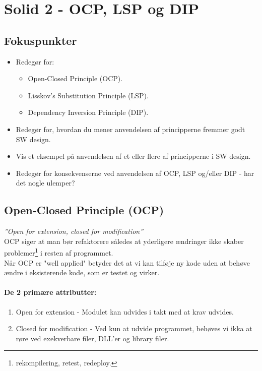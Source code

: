\section{Solid 2 - OCP, LSP og DIP}

\subsection{Fokuspunkter}

\begin{itemize}
	\item Redegør for:
	\begin{itemize}
		\item Open-Closed Principle (OCP).
		\item Lisskov's Substitution Principle (LSP).
		\item Dependency Inversion Principle (DIP).
	\end{itemize}
	\item Redegør for, hvordan du mener anvendelsen af principperne fremmer godt SW design.
	\item Vis et eksempel på anvendelsen af et eller flere af principperne i SW design.
	\item Redegør for konsekvenserne ved anvendelsen af OCP, LSP og/eller DIP - har det nogle ulemper?
\end{itemize}

\subsection{Open-Closed Principle (OCP)}\label{sec:ocp}
\textit{''Open for extension, closed for modification''}\\

OCP siger at man bør refaktorere således at yderligere ændringer ikke skaber problemer\footnote{rekompilering, retest, redeploy.} i resten af programmet.\\

Når OCP er "well applied" betyder det at vi kan tilføje ny kode uden at behøve ændre i eksisterende kode, som er testet og virker.

\paragraph{De 2 primære attributter:}
\begin{enumerate}
	\item Open for extension - Modulet kan udvides i takt med at krav udvides.
	\item Closed for modification - Ved kun at udvide programmet, behøves vi ikka at røre ved exekverbare filer, DLL'er og library filer.
\end{enumerate}

